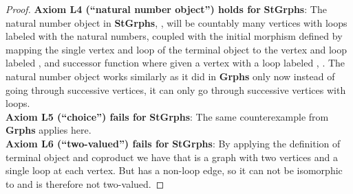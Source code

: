 \documentclass[11pt]{article}
\begin{document}
\begin{proof}
\indent \textbf{Axiom L4 (``natural number object'') holds for} \textbf{StGrphs}: The natural number object in \textbf{StGrphs}, , will be countably many vertices with loops labeled with the natural numbers, coupled with the initial morphism  defined by mapping the single vertex and loop of the terminal object to the vertex and loop labeled , and successor function  where given a vertex with a loop labeled , . The natural number object works similarly as it did in \textbf{Grphs} only now instead of going through successive vertices, it can only go through successive vertices with loops.\\
\indent \textbf{Axiom L5 (``choice'') fails for} \textbf{StGrphs}: The same counterexample from \textbf{Grphs} applies here.\\
\indent \textbf{Axiom L6 (``two-valued'') fails for} \textbf{StGrphs}: By applying the definition of terminal object and coproduct we have that  is a graph with two vertices and a single loop at each vertex. But  has a non-loop edge, so it can not be isomorphic to  and is therefore not two-valued.
\end{proof}
\end{document}
